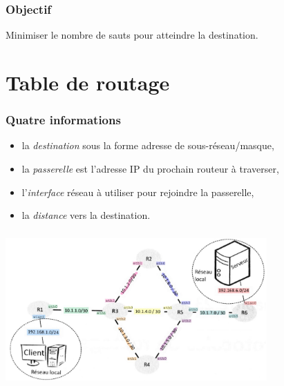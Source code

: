 \documentclass[svgnames,11pt]{beamer}
\begin{document}
\begin{frame}
    \frametitle{Objectif}

    Minimiser le nombre de sauts pour atteindre la destination.

\end{frame}

\section{Table de routage}
\begin{frame}
    \frametitle{Quatre informations}

    \begin{itemize}
        \item la \emph{destination} sous la forme adresse de sous-réseau/masque,
        \item la \emph{passerelle} est l'adresse IP du prochain routeur à traverser,
        \item l'\emph{interface} réseau à utiliser pour rejoindre la passerelle,
        \item la \emph{distance} vers la destination.
    \end{itemize}

\end{frame}

\begin{frame}
    \frametitle{}

    \begin{center}
        \centering
        \includegraphics[width=10cm]{ressources/reseau.png}
        \label{reseau}
    \end{center}

\end{frame}
\end{document}
